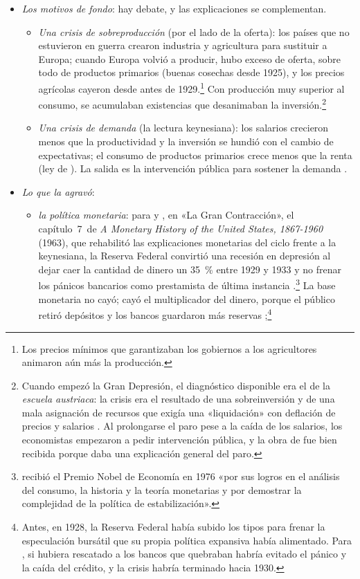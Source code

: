 \documentclass[11pt]{article}
\begin{document}
\begin{itemize}
\item \emph{Los motivos de fondo}: hay debate, y las explicaciones se complementan.
  \begin{itemize}
  \item \emph{Una crisis de sobreproducción} (por el lado de la oferta): los países que no estuvieron en guerra crearon industria y agricultura para sustituir a Europa; cuando Europa volvió a producir, hubo exceso de oferta, sobre todo de productos primarios (buenas cosechas desde 1925), y los precios agrícolas cayeron desde antes de 1929.\footnote{Los precios mínimos que garantizaban los gobiernos a los agricultores animaron aún más la producción.} Con producción muy superior al consumo, se acumulaban existencias que desanimaban la inversión.\footnote{Cuando empezó la Gran Depresión, el diagnóstico disponible era el de la \emph{escuela austriaca}: la crisis era el resultado de una sobreinversión y de una mala asignación de recursos que exigía una «liquidación» con deflación de precios y salarios . Al prolongarse el paro pese a la caída de los salarios, los economistas empezaron a pedir intervención pública, y la obra de  fue bien recibida porque daba una explicación general del paro.}
  \item \emph{Una crisis de demanda} (la lectura keynesiana): los salarios crecieron menos que la productividad y la inversión se hundió con el cambio de expectativas; el consumo de productos primarios crece menos que la renta (ley de ). La salida es la intervención pública para sostener la demanda .
  \end{itemize}
\item \emph{Lo que la agravó}:
  \begin{itemize}
  \item \emph{la política monetaria}: para  y , en «La Gran Contracción», el capítulo~7~de \emph{A Monetary History of the United States, 1867-1960} (1963), que rehabilitó las explicaciones monetarias del ciclo frente a la keynesiana, la Reserva Federal convirtió una recesión en depresión al dejar caer la cantidad de dinero un 35~\% entre 1929 y 1933 y no frenar los pánicos bancarios como prestamista de última instancia\nocite{FriedmanSchwartz1963Monetary} .\footnote{ recibió el Premio Nobel de Economía en 1976 «por sus logros en el análisis del consumo, la historia y la teoría monetarias y por demostrar la complejidad de la política de estabilización»\nocite{Nobel1976Friedman}.} La base monetaria no cayó; cayó el multiplicador del dinero, porque el público retiró depósitos y los bancos guardaron más reservas ;\footnote{Antes, en 1928, la Reserva Federal había subido los tipos para frenar la especulación bursátil que su propia política expansiva había alimentado. Para , si hubiera rescatado a los bancos que quebraban habría evitado el pánico y la caída del crédito, y la crisis habría terminado hacia 1930.}

\end{itemize}
\end{itemize}
\end{document}
